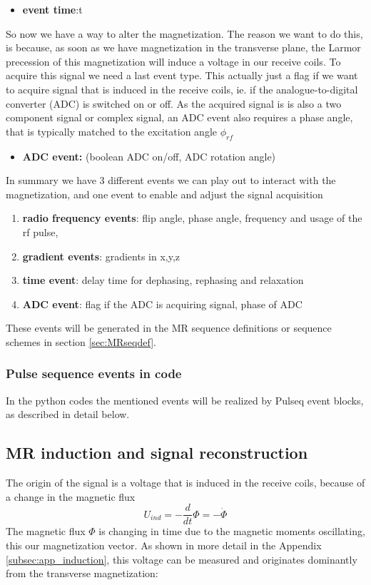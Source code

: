 \documentclass[a4paper,12pt]{extarticle}
\begin{document}
\begin{itemize}
\item \textbf{event time}:t
\end{itemize}

So now we have a way to alter the magnetization. The reason we want to do this, is because, as soon as we have magnetization in the transverse plane, the Larmor precession of this magnetization will induce a voltage in our receive coils.  To acquire this signal we need a last event type. This actually just a flag if we want to acquire signal that is induced in the receive coils, ie. if the analogue-to-digital converter (ADC) is switched on or off. As the acquired signal is is also a two component signal or complex signal, an ADC event also requires a phase angle, that is typically matched to the excitation angle $\phi_{rf}$
\begin{itemize}
\item \textbf{ADC event:} (boolean  ADC on/off, ADC rotation angle)
\end{itemize}

In summary we have 3 different events we can play out to interact with the magnetization, and one event to enable and adjust the signal acquisition
\begin{enumerate}
\itemsep-4pt 
\item \textbf{radio frequency events}: flip angle, phase angle, frequency and usage of the rf pulse, 
\item \textbf{gradient events}: gradients in x,y,z
\item \textbf{time event}: delay time for dephasing, rephasing and relaxation
\item \textbf{ADC event}: flag if the ADC is acquiring signal, phase of ADC
\end{enumerate}

These events will be generated in the MR sequence definitions or sequence schemes in section \ref{sec:MRseqdef}.

\subsubsection{Pulse sequence events in code}

In the python codes the mentioned events will be realized by Pulseq event blocks, as described in detail below.

 \subsection{MR induction and signal reconstruction}
 The origin of the signal is a voltage that is induced in the receive coils, because of a change in the magnetic flux
 \begin{equation}
 U_{ind}=-\frac{d}{dt}\Phi=-\dot\Phi
 \end{equation}
 The magnetic flux $\Phi$ is changing in time due to the magnetic moments oscillating, this our magnetization vector. As shown in more detail in the Appendix \ref{subsec:app_induction}, this voltage can be measured and originates dominantly from the transverse magnetization:
 
\end{document}
